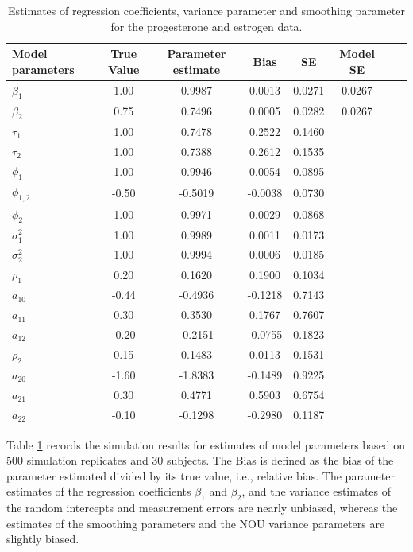 \documentclass[review]{elsarticle}
\begin{document}
\begin{table}[h!]
\centering
\caption{Estimates of regression coefficients, variance parameter and smoothing parameter for the progesterone and estrogen data.} 
\begin{tabular}{l*{6}{c}r}
\hline
\hline
Model parameters & True Value &  Parameter estimate &  Bias &  SE  & Model SE
\\
\hline
$\beta_1$   &  1.00     &  0.9987     &  0.0013     & 0.0271   & 0.0267    \\
$\beta_2$   &  0.75     &  0.7496     &  0.0005     & 0.0282    & 0.0267   \\
$\tau_1$   &  1.00     &  0.7478     &  0.2522     & 0.1460      \\
$\tau_2$   &  1.00     &  0.7388     &  0.2612     & 0.1535      \\
$\phi_1$   &  1.00     &  0.9946     &  0.0054     & 0.0895      \\
$\phi_{1,2}$   & -0.50     & -0.5019     & -0.0038     & 0.0730      \\
$\phi_2$   &  1.00     &  0.9971     &  0.0029     & 0.0868      \\
$\sigma_1^2$   &  1.00     &  0.9989     &  0.0011     & 0.0173      \\
$\sigma_2^2$   &  1.00     &  0.9994     &  0.0006     & 0.0185      \\
$\rho_1$   &  0.20     &  0.1620     &  0.1900     & 0.1034      \\
$a_{10}$   & -0.44     & -0.4936     & -0.1218     & 0.7143      \\
$a_{11}$   &  0.30     &  0.3530     &  0.1767     & 0.7607      \\
$a_{12}$   & -0.20     & -0.2151     & -0.0755     & 0.1823      \\
$\rho_2$   &  0.15     &  0.1483     &  0.0113     & 0.1531      \\
$a_{20}$   & -1.60     & -1.8383     & -0.1489     & 0.9225      \\
$a_{21}$   &  0.30     &  0.4771     &  0.5903     & 0.6754      \\
$a_{22}$   & -0.10     & -0.1298     & -0.2980     & 0.1187      \\
\hline
\end{tabular}
\label{tableSim}
\end{table}


Table \ref{tableSim} records the simulation results for estimates of model parameters based on $500$ simulation replicates and $30$ subjects. The Bias is defined as the bias of the parameter estimated divided by its true value, i.e., relative bias. 
The parameter estimates of the regression coefficients $\beta_1$ and $\beta_2$, and the variance estimates of the random intercepts and measurement errors are nearly unbiased, whereas the estimates of the smoothing parameters and the NOU variance parameters are slightly biased. 
\end{document}
